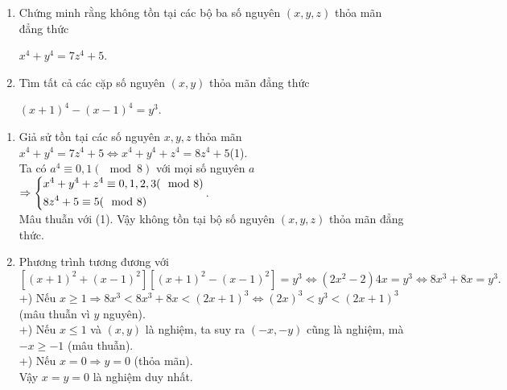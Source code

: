 \begin{ex}%
	\begin{enumerate}
		\item Chứng minh rằng không tồn tại các bộ ba số nguyên $(x,y,z)$ thỏa mãn đẳng thức
		\begin{center}
			$x^4+y^4=7z^4+5$.
		\end{center}
	\item Tìm tất cả các cặp số nguyên $(x,y)$ thỏa mãn đẳng thức
	\begin{center}
		$(x+1)^4-(x-1)^4=y^3$.
	\end{center}
	\end{enumerate}
	\loigiai
	{
	\begin{enumerate}
		\item Giả sử tồn tại các số nguyên $x,y,z$ thỏa mãn\\
			$x^4+y^4=7z^4+5\Leftrightarrow x^4+y^4+z^4=8z^4+5$\hfill(1).\\
			Ta có $a^4\equiv 0,1(\mod 8)$ với mọi số nguyên $a$\\
			$\Rightarrow\left\{\begin{aligned}&x^4+y^4+z^4\equiv 0,1,2,3(\mod 8)\\&8z^4+5\equiv5(\mod 8)\end{aligned}\right.$.\\
			Mâu thuẫn với (1). Vậy không tồn tại bộ số nguyên $(x,y,z)$ thỏa mãn đẳng thức.
			\item Phương trình tương đương với\\
			$\left[(x+1)^2+(x-1)^2 \right]\left[(x+1)^2-(x-1)^2 \right]=y^3\Leftrightarrow(2x^2-2)4x=y^3\Leftrightarrow8x^3+8x=y^3.$\\
			+) Nếu $x\geq 1\Rightarrow 8x^3<8x^3+8x<(2x+1)^3\Leftrightarrow (2x)^3<y^3<(2x+1)^3$ (mâu thuẫn vì $y$ nguyên).\\
			+) Nếu $x\leq 1$ và $(x,y)$ là nghiệm, ta suy ra $(-x,-y)$ cũng là nghiệm, mà $-x\geq -1$ (mâu thuẫn).\\
			+) Nếu $x=0\Rightarrow y=0$ (thỏa mãn).\\
			Vậy $x=y=0$ là nghiệm duy nhất.  
	\end{enumerate}	
	}
\end{ex}
